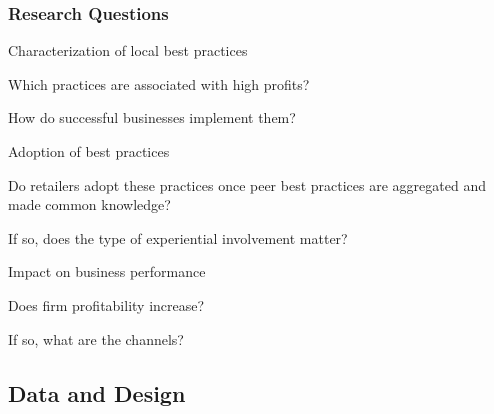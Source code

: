 \documentclass[hideothersubsections, usenames,dvipsnames,11pt]{beamer}
\newenvironment{itemize_2pt}{\itemize\addtolength{\itemsep}{2pt}}{\enditemize}
\begin{document}
\begin{frame}
\frametitle{Research Questions}

	\textcolor{bdf}{Characterization of local best practices}
	\begin{itemize_2pt}
		\item Which practices are associated with high profits?
		\item How do successful businesses implement them?
	\end{itemize_2pt}
	\vspace{1.0em}
	
	\textcolor{bdf}{Adoption of best practices}
	\begin{itemize_2pt}
		\item Do retailers adopt these practices once peer best practices are aggregated and made common knowledge?
		\item If so, does the type of experiential involvement matter?

	\end{itemize_2pt}
    \vspace{1.0em}
    
	\textcolor{bdf}{Impact on business performance}
	\begin{itemize_2pt}
		\item Does firm profitability increase?
		\item If so, what are the channels?
	\end{itemize_2pt}

\end{frame}

\subsection{Data and Design}
\end{document}
